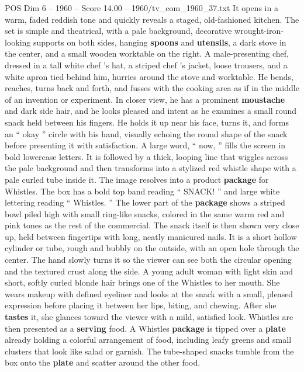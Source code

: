 \begin{textsample}{POS Dim 6 – 1960 – Score 14.00 – 1960/tv\_com\_1960\_37.txt}  \label{ex:f6_pos_024}
It opens in a warm, faded reddish tone and quickly reveals a staged, old-fashioned kitchen.
The set is simple and theatrical, with a pale background, decorative wrought-iron-looking supports on both sides, hanging \textbf{spoons} and \textbf{utensils}, a dark stove in the center, and a small wooden worktable on the right.
A male-presenting chef, dressed in a tall white chef ’s hat, a striped chef ’s jacket, loose trousers, and a white apron tied behind him, hurries around the stove and worktable.
He bends, reaches, turns back and forth, and fusses with the cooking area as if in the middle of an invention or experiment.
In closer view, he has a prominent \textbf{moustache} and dark side hair, and he looks pleased and intent as he examines a small round snack held between his fingers.
He holds it up near his face, turns it, and forms an “ okay ” circle with his hand, visually echoing the round shape of the snack before presenting it with satisfaction.
A large word, “ now, ” fills the screen in bold lowercase letters.
It is followed by a thick, looping line that wiggles across the pale background and then transforms into a stylized red whistle shape with a pale curled tube inside it.
The image resolves into a product \textbf{package} for Whistles.
The box has a bold top band reading “ SNACK! ” and large white lettering reading “ Whistles. ” The lower part of the \textbf{package} shows a striped bowl piled high with small ring-like snacks, colored in the same warm red and pink tones as the rest of the commercial.
The snack itself is then shown very close up, held between fingertips with long, neatly manicured nails.
It is a short hollow cylinder or tube, rough and bubbly on the outside, with an open hole through the center.
The hand slowly turns it so the viewer can see both the circular opening and the textured crust along the side.
A young adult woman with light skin and short, softly curled blonde hair brings one of the Whistles to her mouth.
She wears makeup with defined eyeliner and looks at the snack with a small, pleased expression before placing it between her lips, biting, and chewing.
After she \textbf{tastes} it, she glances toward the viewer with a mild, satisfied look.
Whistles are then presented as a \textbf{serving} food.
A Whistles \textbf{package} is tipped over a \textbf{plate} already holding a colorful arrangement of food, including leafy greens and small clusters that look like salad or garnish.
The tube-shaped snacks tumble from the box onto the \textbf{plate} and scatter around the other food.

\end{textsample}
